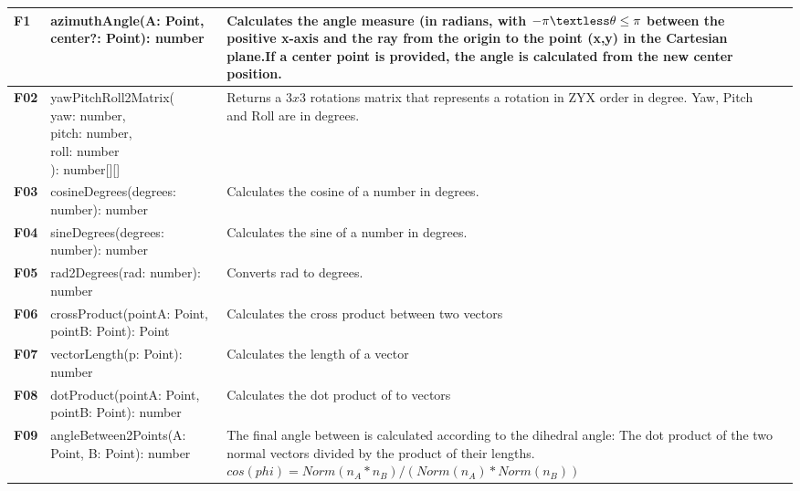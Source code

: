 \begin{xltabular}{\textwidth}{|M{1.2cm}|X|X|M{3cm}|}
\hline 
 \endlastfoot 
\textbf{ F1 } & {\ttfamily azimuthAngle(A: Point, center?: Point): number} & Calculates the angle measure (in radians, with $-\pi \textless \theta \le \pi$ between the positive x-axis and the ray from the origin to the point {\ttfamily(x,y)} in the Cartesian plane.\newline If a center point is provided, the angle is calculated from the new center position. &  \\ \hline 
  \textbf{F02} & {\ttfamily yawPitchRoll2Matrix( \newline yaw: number,\newline pitch: number,\newline roll: number\newline): number[][]} & Returns a $3x3$ rotations matrix that represents a rotation in ZYX order in degree. \newline Yaw, Pitch and Roll are in degrees. &  \\ \hline 
  \textbf{F03} & {\ttfamily cosineDegrees(degrees: number): number } & Calculates the cosine of a number in degrees. &  \\ \hline 
  \textbf{F04} & {\ttfamily sineDegrees(degrees: number): number} & Calculates the sine of a number in degrees. &  \\ \hline 
  \textbf{F05} & {\ttfamily rad2Degrees(rad: number): number} & Converts rad to degrees. &  \\ \hline 
  \textbf{F06} & {\ttfamily crossProduct(pointA: Point, pointB: Point): Point} & Calculates the cross product between two vectors &  \\ \hline 
  \textbf{F07} & {\ttfamily vectorLength(p: Point): number} & Calculates the length of a vector &  \\ \hline 
  \textbf{F08} & {\ttfamily dotProduct(pointA: Point, pointB: Point): number} & Calculates the dot product of to vectors &  \\ \hline 
  \textbf{F09} & {\ttfamily angleBetween2Points(A: Point, B: Point): number} & The final angle between is calculated according to the dihedral angle: The dot product of the two normal vectors divided by the product of their lengths. \newline $cos(phi) = Norm(n_A * n_B) / (Norm(n_A) * Norm(n_B))$ &  \\ \hline 

\end{xltabular}
